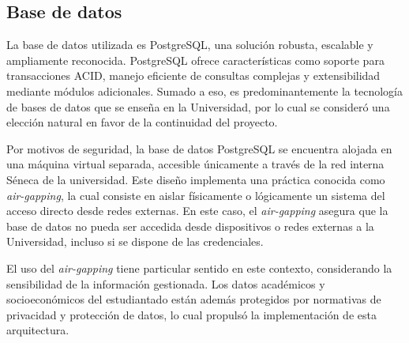 \subsection{Base de datos}

La base de datos utilizada es \gls{PostgreSQL}, una solución robusta, escalable y ampliamente reconocida. \gls{PostgreSQL} ofrece características como soporte para transacciones ACID, manejo eficiente de consultas complejas y extensibilidad mediante módulos adicionales. Sumado a eso, es predominantemente la tecnología de bases de datos que se enseña en la Universidad, por lo cual se consideró una elección natural en favor de la continuidad del proyecto.

Por motivos de seguridad, la base de datos \gls{PostgreSQL} se encuentra alojada en una máquina virtual separada, accesible únicamente a través de la red interna Séneca de la universidad. Este diseño implementa una práctica conocida como \textit{air-gapping}, la cual consiste en aislar físicamente o lógicamente un sistema del acceso directo desde redes externas. En este caso, el \textit{air-gapping} asegura que la base de datos no pueda ser accedida desde dispositivos o redes externas a la Universidad, incluso si se dispone de las credenciales.

El uso del \textit{air-gapping} tiene particular sentido en este contexto, considerando la sensibilidad de la información gestionada. Los datos académicos y socioeconómicos del estudiantado están además protegidos por normativas de privacidad y protección de datos, lo cual propulsó la implementación de esta arquitectura.

